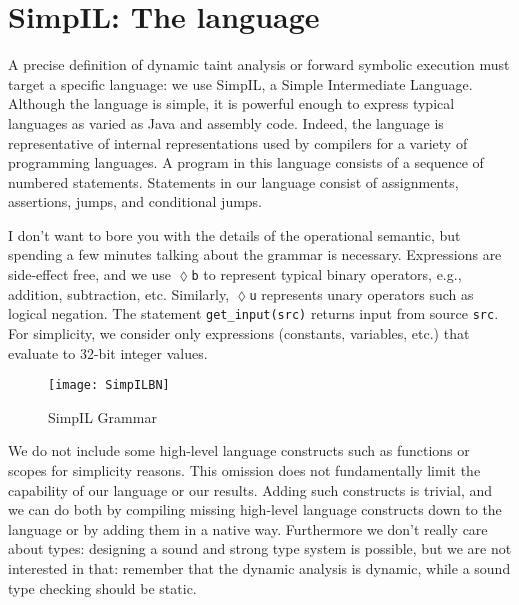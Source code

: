 \section{SimpIL: The language}
A precise definition of dynamic taint analysis or forward symbolic execution must target a specific language: we use SimpIL, a Simple Intermediate Language. Although the language is simple, it is powerful enough to express typical languages as varied as Java and assembly code. Indeed, the language is representative of internal representations used by compilers for a variety of programming languages. A program in this language consists of a sequence of numbered statements. Statements in our language consist of assignments, assertions, jumps, and conditional jumps.

I don't want to bore you with the details of the operational semantic, but spending a few minutes talking about the grammar is necessary. Expressions are side-effect free, and we use \texttt{$\lozenge$b} to represent typical binary operators, e.g., addition, subtraction, etc. Similarly, \texttt{$\lozenge$u} represents unary operators such as logical negation. The statement \texttt{get\_input(src)} returns input from source \texttt{src}. For simplicity, we consider only expressions (constants, variables, etc.) that evaluate to 32-bit integer values.

\begin{figure}[ht!]
	\caption{SimpIL Grammar}
	\centering
	\texttt{[image: SimpILBN]}
\end{figure}

We do not include some high-level language constructs such as functions or scopes for simplicity reasons. This omission does not fundamentally limit the capability of our language or our results. Adding such constructs is trivial, and we can do both by compiling missing high-level language constructs down to the language or by adding them in a native way. Furthermore we don't really care about types: designing a sound and strong type system is possible, but we are not interested in that: remember that the dynamic analysis is dynamic, while a sound type checking should be static.

